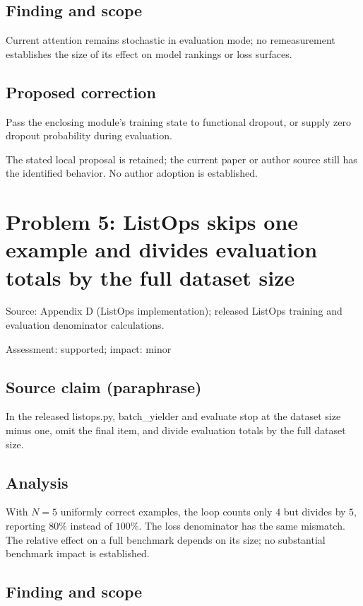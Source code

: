\documentclass[11pt]{article}
\begin{document}
\subsection*{Finding and scope}

Current attention remains stochastic in evaluation mode; no remeasurement establishes the size of its effect on model rankings or loss surfaces.

\subsection*{Proposed correction}

Pass the enclosing module’s training state to functional dropout, or supply zero dropout probability during evaluation.

The stated local proposal is retained; the current paper or author source still has the identified behavior. No author adoption is established.

\section*{Problem 5: ListOps skips one example and divides evaluation totals by the full dataset size}

Source: Appendix D (ListOps implementation); released ListOps training and evaluation denominator calculations.

Assessment: supported; impact: minor

\subsection*{Source claim (paraphrase)}

In the released listops.py, batch\_yielder and evaluate stop at the dataset size minus one, omit the final item, and divide evaluation totals by the full dataset size.

\subsection*{Analysis}

With \(N=5\) uniformly correct examples, the loop counts only \(4\) but divides by \(5\), reporting \(80\%\) instead of \(100\%\). The loss denominator has the same mismatch. The relative effect on a full benchmark depends on its size; no substantial benchmark impact is established.

\subsection*{Finding and scope}
\end{document}
